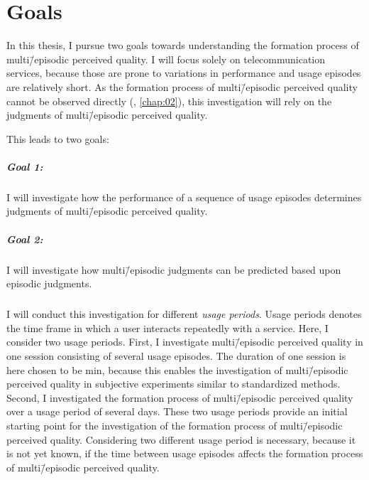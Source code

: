 
\section{Goals}
In this thesis, I pursue two goals towards understanding the formation process of multi\=/episodic perceived quality.
I will focus solely on telecommunication services, because those are prone to variations in performance and usage episodes are relatively short.
As the formation process of multi\=/episodic perceived quality cannot be observed directly (\cf, \autoref{chap:02}), this investigation will rely on the judgments of multi\=/episodic perceived quality.

This leads to two goals:

\subparagraph*{Goal 1:}
I will investigate how the performance of a sequence of usage episodes determines judgments of multi\=/episodic perceived quality.

\subparagraph*{Goal 2:}
I will investigate how multi\=/episodic judgments can be predicted based upon episodic judgments.

\subparagraph*{}
I will conduct this investigation for different \emph{usage periods}.
Usage periods denotes the time frame in which a user interacts repeatedly with a service.
Here, I consider two usage periods.
First, I investigate multi\=/episodic perceived quality in one session consisting of several usage episodes.
The duration of one session is here chosen to be \unit[45]{min}, because this enables the investigation of multi\=/episodic perceived quality in subjective experiments similar to standardized methods.
Second, I investigated the formation process of multi\=/episodic perceived quality over a usage period of several days.
These two usage periods provide an initial starting point for the investigation of the formation process of multi\=/episodic perceived quality.
Considering two different usage period is necessary, because it is not yet known, if the time between usage episodes affects the formation process of multi\=/episodic perceived quality.

